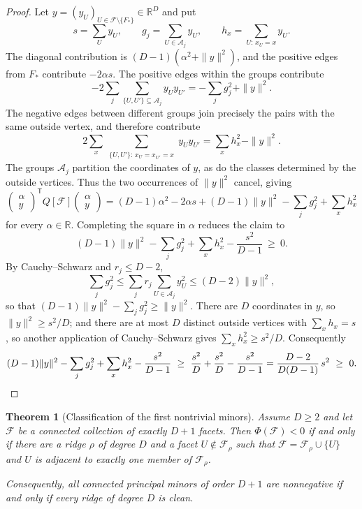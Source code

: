 \documentclass[11pt,reqno]{amsart}
\numberwithin{equation}{section}
\theoremstyle{plain}
\newtheorem{theorem}{Theorem}[section]
\theoremstyle{definition}
\newcommand{\R}{\mathbb{R}}
\newcommand{\T}{\mathsf{T}}
\newcommand{\Aset}{\mathcal A}
\newcommand{\Fset}{\mathcal F}
\begin{document}
\begin{proof}
Let $y={(y_U)}_{U\in\Fset\setminus\{F_*\}}\in\R^{D}$ and put
\[
  s=\sum_U y_U,\qquad g_j=\sum_{U\in\Aset_j}y_U,\qquad h_x=\sum_{U:\,x_U=x}y_U .
\]
The diagonal contribution is $(D-1)(\alpha^2+\|y\|^2)$, and the positive edges from $F_*$
contribute $-2\alpha s$. The positive edges within the groups contribute
\[
  -2\sum_j\sum_{\{U,U'\}\subseteq\Aset_j}y_Uy_{U'}
  =-\sum_j g_j^2+\|y\|^2.
\]
The negative edges between different groups join precisely the pairs with the same outside
vertex, and therefore contribute
\[
  2\sum_x\sum_{\substack{\{U,U'\}:\,x_U=x_{U'}=x}}y_Uy_{U'}
  =\sum_x h_x^2-\|y\|^2.
\]
The groups $\Aset_j$ partition the coordinates of $y$, as do the classes determined by the
outside vertices. Thus the two occurrences of $\|y\|^2$ cancel, giving
\[
  \begin{pmatrix}\alpha\\ y\end{pmatrix}^{\T}Q[\Fset]\begin{pmatrix}\alpha\\ y\end{pmatrix}
  =(D-1)\alpha^2-2\alpha s+(D-1)\|y\|^2-\sum_{j}g_j^2+\sum_x h_x^2
\]
for every $\alpha\in\R$. Completing the square in $\alpha$ reduces the claim to
\[
  (D-1)\|y\|^2-\sum_j g_j^2+\sum_x h_x^2-\frac{s^2}{D-1}\ \ge\ 0 .
\]
By Cauchy--Schwarz and $r_j\le D-2$,
\[
  \sum_j g_j^2\le\sum_j r_j\sum_{U\in\Aset_j}y_U^2\le(D-2)\|y\|^2,
\]
so that $(D-1)\|y\|^2-\sum_j g_j^2\ge\|y\|^2$. There are $D$ coordinates in $y$, so
$\|y\|^2\ge s^2/D$; and there are at most $D$ distinct outside vertices with
$\sum_x h_x=s$, so another application of Cauchy--Schwarz gives $\sum_x h_x^2\ge s^2/D$.
Consequently
\[
  (D-1)\|y\|^2-\sum_j g_j^2+\sum_x h_x^2-\frac{s^2}{D-1}
  \ \ge\ \frac{s^2}{D}+\frac{s^2}{D}-\frac{s^2}{D-1}
  =\frac{D-2}{D(D-1)}\,s^2\ \ge\ 0 . \qedhere
\]
\end{proof}

\begin{theorem}[Classification of the first nontrivial minors]\label{thm:Dplus1}
Assume $D\ge2$ and let $\Fset$ be a connected collection of exactly $D+1$ facets. Then
$\Phi(\Fset)<0$ if and only if there are a ridge $\rho$ of degree $D$ and a facet
$U\notin\Fset_\rho$ such that $\Fset=\Fset_\rho\cup\{U\}$ and $U$ is adjacent to exactly one
member of $\Fset_\rho$.

Consequently, all connected principal minors of order $D+1$ are nonnegative if and only if every
ridge of degree $D$ is clean.
\end{theorem}
\end{document}

